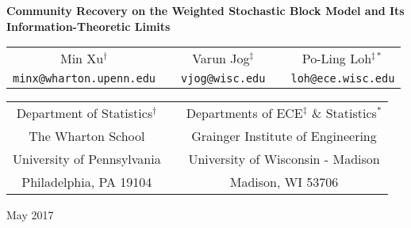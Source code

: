 \documentclass{article}
\begin{document}
\begin{center}
{\bf{\Large{Community Recovery on the Weighted Stochastic Block Model and Its Information-Theoretic Limits}}}

\vspace*{.25in}

\begin{tabular}{ccccc}
{\large{Min Xu$^\dagger$}} & \hspace*{.2in} & {\large{Varun Jog$^\ddagger$}} & \hspace*{.2in} & {\large{Po-Ling Loh$^{\ddagger*}$}} \\
{\large{\texttt{minx@wharton.upenn.edu}}} & & {\large{\texttt{vjog@wisc.edu}}} & & {\large{\texttt{loh@ece.wisc.edu}}}
\end{tabular}

\vspace{.2in}

\begin{tabular}{ccc}
Department of Statistics$^\dagger$ & \hspace{.3in} & Departments of ECE$^\ddagger$ \& Statistics$^*$ \\
The Wharton School && Grainger Institute of Engineering \\
University of Pennsylvania && University of Wisconsin - Madison \\ Philadelphia, PA 19104 & & Madison, WI 53706
\end{tabular}
 
\vspace*{.2in}

May 2017

\vspace*{.2in}

\end{center}
\end{document}
